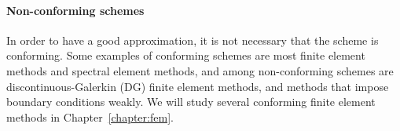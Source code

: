 \paragraph{Non-conforming schemes}\label{sec:non-conforming-schemes}
In order to have a good approximation, it is not necessary that the scheme is conforming. Some examples of conforming schemes are most finite element methods and spectral element methods, and among non-conforming schemes are discontinuous-Galerkin (DG) finite element methods, and methods that impose boundary conditions weakly. We will study several conforming finite element methods in Chapter~\ref{chapter:fem}. 

